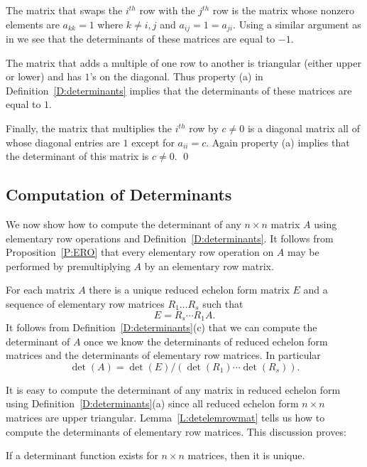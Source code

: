 \documentclass{ximera}
\begin{document}
\proof The matrix that swaps the $i^{th}$ row with the $j^{th}$
row is the matrix whose nonzero elements are $a_{kk}=1$ where
$k\neq i,j$ and $a_{ij}=1=a_{ji}$.  Using a similar argument as
in  we see that the determinants of these
matrices are equal to $-1$.
 
The matrix that adds a multiple of one row to another is
triangular (either upper or lower) and has $1$'s on the
diagonal.  Thus property (a) in Definition~\ref{D:determinants}
implies that the determinants of
these matrices are equal to $1$.
 
Finally, the matrix that multiplies the $i^{th}$ row by $c\neq
0$ is a diagonal matrix all of whose diagonal entries are $1$
except for $a_{ii}=c$.  Again property (a) implies that the
determinant of this matrix is $c\neq 0$. \qed


\subsection*{Computation of Determinants}

We now show how to compute the determinant of any $n\times n$ matrix $A$ 
using elementary row operations and Definition~\ref{D:determinants}.  It 
follows from Proposition~\ref{P:ERO} that every elementary row operation 
on $A$ may be performed by premultiplying $A$ by an elementary row matrix. 

For each matrix $A$ there is a unique 
reduced echelon form matrix
$E$ and a sequence of elementary row matrices $R_1\ldots R_s$
such that 
\begin{equation}  \label{e:rowreduction}
E = R_s\cdots R_1A.
\end{equation}
It follows from Definition~\ref{D:determinants}(c) that we can
compute the determinant of $A$ once we know the determinants of
reduced echelon form matrices and the determinants of elementary
row matrices.  In particular
\begin{equation}  \label{e:detformula}
\det(A) = \det(E)/(\det(R_1)\cdots\det(R_s)).
\end{equation}

It is easy to compute the determinant of any matrix in reduced echelon 
form using Definition~\ref{D:determinants}(a) since all reduced echelon 
form $n\times n$ matrices are upper triangular.  Lemma~\ref{L:detelemrowmat}  
tells us how to compute the determinants of elementary row matrices.  This 
discussion proves: 
\begin{prop}
If a determinant function exists for $n\times n$ matrices, then it is unique. 
\end{prop}
\end{document}
